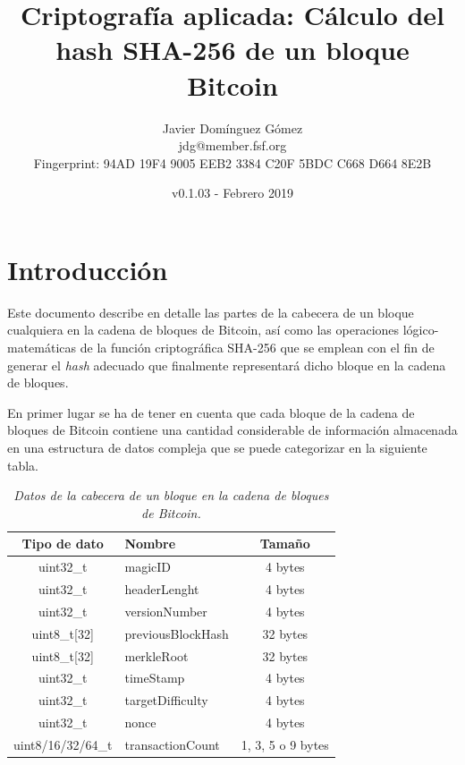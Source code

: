 \documentclass{article}
\title{\textbf{Criptografía aplicada: Cálculo del hash SHA-256 de un bloque Bitcoin}}
\author{Javier Domínguez Gómez \\
\small{jdg@member.fsf.org} \\
\small{Fingerprint: 94AD 19F4 9005 EEB2 3384 C20F 5BDC C668 D664 8E2B}}
\date{v0.1.03 - Febrero 2019}
\begin{document}
\maketitle

\tableofcontents{}

\section{Introducción}
    Este documento describe en detalle las partes de la cabecera de un bloque cualquiera en la cadena de bloques de Bitcoin, así como las operaciones lógico-matemáticas de la función criptográfica SHA-256 que se emplean con el fin de generar el \textit{hash} adecuado que finalmente representará dicho bloque en la cadena de bloques.
    
    \vspace{3mm}
    En primer lugar se ha de tener en cuenta que cada bloque de la cadena de bloques de Bitcoin contiene una cantidad considerable de información almacenada en una estructura de datos compleja que se puede categorizar en la siguiente tabla.
    \begin{table}[H]
    \centering
    \begin{tabular}{| c | l | c |} 
        \hline
        Tipo de dato & Nombre & Tamaño \\
        \hline
        uint32\_t & magicID & 4 bytes \\
        \hline
        uint32\_t & headerLenght & 4 bytes \\
        \hline
        uint32\_t & versionNumber & 4 bytes \\
        \hline
        uint8\_t[32] & previousBlockHash & 32 bytes \\
        \hline
        uint8\_t[32] & merkleRoot & 32 bytes \\
        \hline
        uint32\_t & timeStamp & 4 bytes \\
        \hline
        uint32\_t & targetDifficulty & 4 bytes \\
        \hline
        uint32\_t & nonce & 4 bytes \\
        \hline
        uint8/16/32/64\_t & transactionCount & 1, 3, 5 o 9 bytes \\
        \hline
    \end{tabular}
    \caption{\textit{Datos de la cabecera de un bloque en la cadena de bloques de Bitcoin.}}
    \label{table:2}
    \end{table}
    
\end{document}
